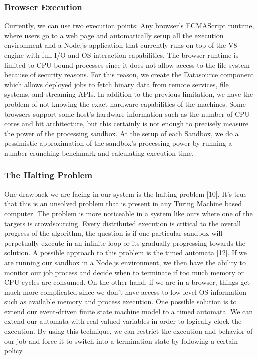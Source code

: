 \documentclass[10pt,reprint]{socc14}
\begin{document}
\subsubsection{Browser Execution}
Currently, we can use two execution points: Any browser’s ECMAScript runtime, where users go to a web page and automatically setup all the execution environment and a Node.js application that currently runs on top of the V8 engine with full I/O and OS interaction capabilities. The browser runtime is limited to CPU-bound processes since it does not allow access to the file system because of security reasons. For this reason, we create the Datasource component which allows deployed jobs to fetch binary data from remote services, file systems, and streaming APIs. In addition to the previous limitation, we have the problem of not knowing the exact hardware capabilities of the machines. Some browsers support some host’s hardware information such as the number of CPU cores and bit architecture, but this certainly is not enough to precisely measure the power of the processing sandbox. At the setup of each Sandbox, we do a pessimistic approximation of the sandbox’s processing power by running a number crunching benchmark and calculating execution time.


\subsubsection{The Halting Problem}
One drawback we are facing in our system is the halting problem [10]. It’s true that this is an unsolved problem that is present in any Turing Machine based computer. The problem is more noticeable in a system like ours where one of the targets is crowdsourcing. Every distributed execution is critical to the overall progress of the  algorithm, the question is if one particular sandbox will perpetually execute in an infinite loop or its gradually progressing towards the solution. A possible approach to this problem is the timed automata [12]. If we are running our sandbox in a Node.js environment, we then have the ability to monitor our job process and decide when to terminate if too much memory or CPU cycles are consumed. On the other hand, if we are in a browser, things get much more complicated since we don't have access to low-level OS information such as available memory and process execution. One possible solution is to extend our event-driven finite state machine model to a timed automata. We can extend our automata with real-valued variables in order to logically clock the execution. By using this technique, we can restrict the execution and behavior of our job and force it to switch into a termination state by following a certain policy.
\end{document}
